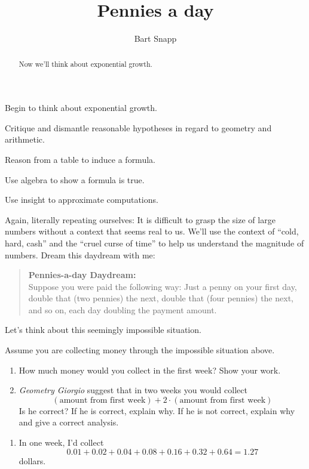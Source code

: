 \documentclass[nooutcomes,noauthor,hints]{ximera}
\title{Pennies a day}
\author{Bart Snapp}
\begin{document}
\begin{abstract}
  Now we'll think about exponential growth.
\end{abstract}
\maketitle

\begin{listOutcomes}
\item Begin to think about exponential growth.
\item Critique and dismantle reasonable hypotheses in regard to
  geometry and arithmetic.
\item Reason from a table to induce a formula.
\item Use algebra to show a formula is true.
\item Use insight to approximate computations.
\end{listOutcomes}


Again, literally repeating ourselves: It is difficult to grasp the
size of large numbers without a context that seems real to us. We'll
use the context of ``cold, hard, cash'' and the ``cruel curse of
time'' to help us understand the magnitude of numbers.  Dream this
daydream with me:
\begin{mdframed}[style=OutcomeStyle]
  \begin{quote}
  \textbf{Pennies-a-day Daydream:}\\
  Suppose you were paid the following way: Just a penny on your first
  day, double that (two pennies) the next, double that (four pennies)
  the next, and so on, each day doubling the payment amount.
\end{quote}
\end{mdframed}
Let's think about this seemingly impossible situation.



\mynewpage


\begin{question}
  Assume you are collecting money through the impossible situation
  above.
  \begin{enumerate}
  \item How much money would you collect in the first week? Show your
    work.
  \item \textit{Geometry Giorgio} suggest that in two weeks you would
    collect
    \[
    (\text{amount from first week}) + 2\cdot (\text{amount from first
      week})
    \]
    Is he correct? If he is correct, explain why. If he is not
    correct, explain why and give a correct analysis.
  \end{enumerate}
  \begin{freeResponse}
    \begin{enumerate}
    \item In one week, I'd collect
      \[
      0.01+0.02+0.04+0.08+0.16+0.32+0.64 = 1.27
      \]
      dollars.
    \end{enumerate}
  \end{freeResponse}
\end{question}
\mynewpage
\end{document}
